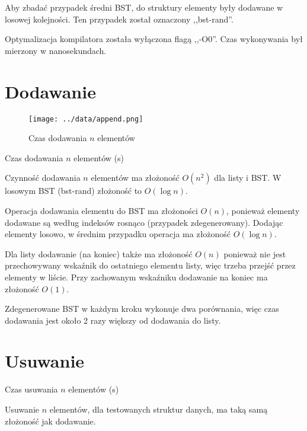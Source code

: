 \documentclass[11pt,twocolumn]{article}
\begin{document}
Aby zbadać przypadek średni BST, do struktury elementy były dodawane w losowej kolejności. Ten przypadek został oznaczony ,,bst-rand''.

Optymalizacja kompilatora została wyłączona flagą ,,-O0''. Czas wykonywania był mierzony w nanosekundach.



\section{Dodawanie}

\begin{figure}[h]
	\texttt{[image: ../data/append.png]}
	\caption{Czas dodawania $n$ elementów \label{append}}
\end{figure}

\begin{table}[h]
	\centering
	\caption{Czas dodawania $n$ elementów (s)}
\end{table}

Czynność dodawania $n$ elementów ma złożoność $O(n^2)$ dla listy i BST. W losowym BST (bst-rand) złożoność to $O(\log n)$.

Operacja dodawania elementu do BST ma złożoności $O(n)$, ponieważ elementy dodawane są według indeksów rosnąco (przypadek zdegenerowany). Dodając elementy losowo, w średnim przypadku operacja ma złożoność $O(\log n)$.

Dla listy dodawanie (na koniec) także ma złożoność $O(n)$ ponieważ nie jest przechowywany wskaźnik do ostatniego elementu listy, więc trzeba przejść przez elementy w liście. Przy zachowanym wskaźniku dodawanie na koniec ma złożoność $O(1)$.

Zdegenerowane BST w każdym kroku wykonuje dwa porównania, więc czas dodawania jest około 2 razy większy od dodawania do listy.



\section{Usuwanie}

\begin{table}[h!]
	\centering
	\caption{Czas usuwania $n$ elementów (s)}
\end{table}

Usuwanie $n$ elementów, dla testowanych struktur danych, ma taką samą złożoność jak dodawanie.
\end{document}
